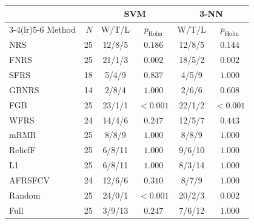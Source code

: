 \begin{minipage}{\linewidth}
\centering
{}
\label{tab:pairwise}
\small
\begin{tabular}{@{}lrcccc@{}}
\toprule
 & & \multicolumn{2}{c}{SVM} & \multicolumn{2}{c}{3-NN} \\ \cmidrule(lr){3-4}\cmidrule(lr){5-6}
Method & $N$ & W/T/L & $p_{\mathrm{Holm}}$ & W/T/L & $p_{\mathrm{Holm}}$ \\
\midrule
NRS & 25 & 12/8/5 & $0.186$ & 12/8/5 & $0.144$ \\
FNRS & 25 & 21/1/3 & $0.002$ & 18/5/2 & $0.002$ \\
SFRS & 18 & 5/4/9 & $0.837$ & 4/5/9 & $1.000$ \\
GBNRS & 14 & 2/8/4 & $1.000$ & 2/6/6 & $0.608$ \\
FGB & 25 & 23/1/1 & $<0.001$ & 22/1/2 & $<0.001$ \\
WFRS & 24 & 14/4/6 & $0.247$ & 12/5/7 & $0.443$ \\
mRMR & 25 & 8/8/9 & $1.000$ & 8/8/9 & $1.000$ \\
ReliefF & 25 & 6/8/11 & $1.000$ & 9/6/10 & $1.000$ \\
L1 & 25 & 6/8/11 & $1.000$ & 8/3/14 & $1.000$ \\
AFRSFCV & 24 & 12/6/6 & $0.310$ & 8/7/9 & $1.000$ \\
Random & 25 & 24/0/1 & $<0.001$ & 20/2/3 & $0.002$ \\
Full & 25 & 3/9/13 & $0.247$ & 7/6/12 & $1.000$ \\
\bottomrule
\end{tabular}
\end{minipage}\par
